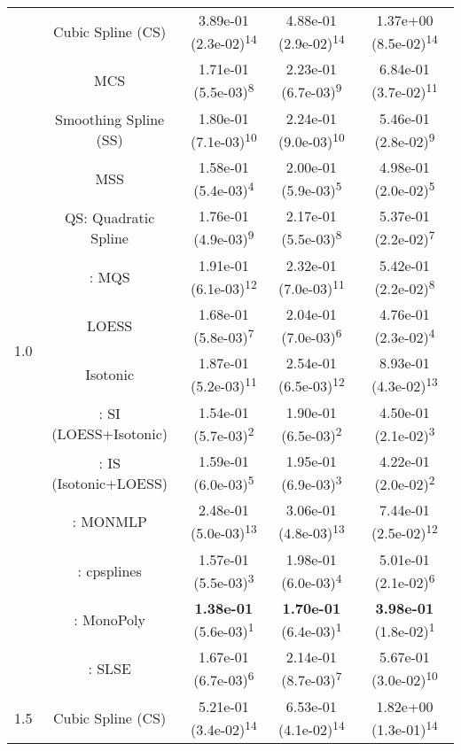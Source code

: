 \begin{tabular}{ccccc}
\multirow{14}{*}{1.0}&Cubic Spline (CS)& 3.89e-01 (2.3e-02)\textsuperscript{14}& 4.88e-01 (2.9e-02)\textsuperscript{14}& 1.37e+00 (8.5e-02)\textsuperscript{14}\tabularnewline
&MCS& 1.71e-01 (5.5e-03)\textsuperscript{8}& 2.23e-01 (6.7e-03)\textsuperscript{9}& 6.84e-01 (3.7e-02)\textsuperscript{11}\tabularnewline
&Smoothing Spline (SS)& 1.80e-01 (7.1e-03)\textsuperscript{10}& 2.24e-01 (9.0e-03)\textsuperscript{10}& 5.46e-01 (2.8e-02)\textsuperscript{9}\tabularnewline
&MSS& 1.58e-01 (5.4e-03)\textsuperscript{4}& 2.00e-01 (5.9e-03)\textsuperscript{5}& 4.98e-01 (2.0e-02)\textsuperscript{5}\tabularnewline
&QS: Quadratic Spline& 1.76e-01 (4.9e-03)\textsuperscript{9}& 2.17e-01 (5.5e-03)\textsuperscript{8}& 5.37e-01 (2.2e-02)\textsuperscript{7}\tabularnewline
&\textcite{heMonotoneBsplineSmoothing1998}: MQS& 1.91e-01 (6.1e-03)\textsuperscript{12}& 2.32e-01 (7.0e-03)\textsuperscript{11}& 5.42e-01 (2.2e-02)\textsuperscript{8}\tabularnewline
&LOESS& 1.68e-01 (5.8e-03)\textsuperscript{7}& 2.04e-01 (7.0e-03)\textsuperscript{6}& 4.76e-01 (2.3e-02)\textsuperscript{4}\tabularnewline
&Isotonic& 1.87e-01 (5.2e-03)\textsuperscript{11}& 2.54e-01 (6.5e-03)\textsuperscript{12}& 8.93e-01 (4.3e-02)\textsuperscript{13}\tabularnewline
&\textcite{mammenEstimatingSmoothMonotone1991}: SI (LOESS+Isotonic)& 1.54e-01 (5.7e-03)\textsuperscript{2}& 1.90e-01 (6.5e-03)\textsuperscript{2}& 4.50e-01 (2.1e-02)\textsuperscript{3}\tabularnewline
&\textcite{mammenEstimatingSmoothMonotone1991}: IS (Isotonic+LOESS)& 1.59e-01 (6.0e-03)\textsuperscript{5}& 1.95e-01 (6.9e-03)\textsuperscript{3}& 4.22e-01 (2.0e-02)\textsuperscript{2}\tabularnewline
&\textcite{cannonMonmlpMultilayerPerceptron2017}: MONMLP& 2.48e-01 (5.0e-03)\textsuperscript{13}& 3.06e-01 (4.8e-03)\textsuperscript{13}& 7.44e-01 (2.5e-02)\textsuperscript{12}\tabularnewline
&\textcite{navarro-garciaConstrainedSmoothingOutofrange2023}: cpsplines& 1.57e-01 (5.5e-03)\textsuperscript{3}& 1.98e-01 (6.0e-03)\textsuperscript{4}& 5.01e-01 (2.1e-02)\textsuperscript{6}\tabularnewline
&\textcite{murrayFastFlexibleMethods2016a}: MonoPoly& \textbf{1.38e-01} (5.6e-03)\textsuperscript{1}& \textbf{1.70e-01} (6.4e-03)\textsuperscript{1}& \textbf{3.98e-01} (1.8e-02)\textsuperscript{1}\tabularnewline
&\textcite{groeneboomConfidenceIntervalsMonotone2023}: SLSE& 1.67e-01 (6.7e-03)\textsuperscript{6}& 2.14e-01 (8.7e-03)\textsuperscript{7}& 5.67e-01 (3.0e-02)\textsuperscript{10}\tabularnewline
\midrule
\multirow{14}{*}{1.5}&Cubic Spline (CS)& 5.21e-01 (3.4e-02)\textsuperscript{14}& 6.53e-01 (4.1e-02)\textsuperscript{14}& 1.82e+00 (1.3e-01)\textsuperscript{14}\tabularnewline

\end{tabular}
